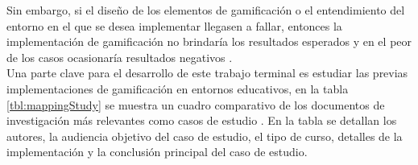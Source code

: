  \noindent Sin embargo, si el diseño de los elementos de gamificación o el 
 entendimiento del entorno en el que se desea implementar llegasen a fallar, 
 entonces la implementación de gamificación no brindaría los resultados esperados 
 y en el peor de los casos ocasionaría resultados negativos
 \cite[p. 1109]{GamInE-Learning}.\\

 \noindent Una parte clave para el desarrollo de este trabajo terminal es estudiar 
 las previas implementaciones de gamificación en entornos educativos, en la tabla 
 \ref{tbl:mappingStudy} se muestra un cuadro comparativo de los documentos de 
 investigación más relevantes como casos de estudio \cite{mappingStudy}. En la tabla 
 se detallan los autores, la audiencia objetivo del caso de estudio, el tipo de 
 curso, detalles de la implementación y la conclusión principal del caso de estudio.\\

